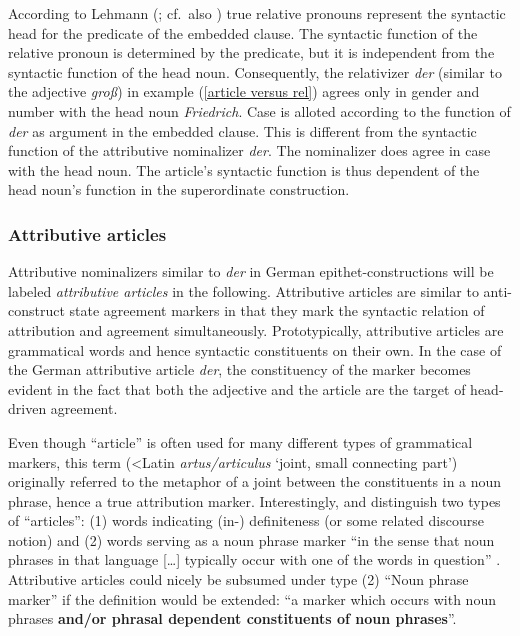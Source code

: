 According to Lehmann (\citeyear[230–231]{lehmann1984}; cf.~also \citealt[181]{himmelmann1997}) true relative pronouns represent the syntactic head for the predicate of the embedded clause. The syntactic function of the relative pronoun is determined by the predicate, but it is independent from the syntactic function of the head noun. Consequently, the relativizer \textit{der} (similar to the adjective \textit{groß}) in example (\ref{article versus rel}) agrees only in gender and number with the head noun \textit{Friedrich}. Case is alloted according to the function of \textit{der} as argument in the embedded clause. This is different from the syntactic function of the attributive nominalizer \textit{der}. The nominalizer does agree in case with the head noun. The article's syntactic function is thus dependent of the head noun's function in the superordinate construction.

\subsubsection{Attributive articles} \label{attr art}
Attributive nominalizers similar to \textit{der} in German epithet-constructions will be labeled \emph{attributive articles} in the following. Attributive articles are similar to anti-construct state agreement markers in that they mark the syntactic relation of attribution and agreement simultaneously. Prototypically, attributive articles are grammatical words and hence syntactic constituents on their own. In the case of the German attributive article \textit{der}, the constituency of the marker becomes evident in the fact that both the adjective and the article are the target of head-driven agreement.

Even though “article” is often used for many different types of grammatical markers, this term (<Latin \emph{artus\fshyp{}articulus} ‘joint, small connecting part’) originally referred to the metaphor of a joint between the constituents in a noun phrase, hence a true attribution marker. Interestingly, \citet[83]{dryer1989a} and \citet{rijkhoff2002} distinguish two types of “articles”: (1) words indicating (in-) definiteness (or some related discourse notion) and (2) words serving as a noun phrase marker “in the sense that noun phrases in that language [\dots] typically occur with one of the words in question” \citep[285]{rijkhoff2002}. Attributive articles could nicely be subsumed under type (2) “Noun phrase marker” if the definition would be extended:  “a marker which occurs with noun phrases \textbf{and\fshyp{}or phrasal dependent constituents of noun phrases}”.

